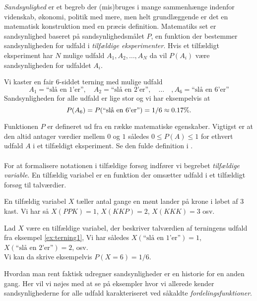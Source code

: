 \emph{Sandsynlighed} er et begreb der (mis)bruges i mange sammenhænge indenfor videnskab, økonomi, politik med mere, men helt grundlæggende er det en matematisk konstruktion med en præcis definition. Matematiks set er sandsynlighed baseret på sandsynlighedsmålet $P$, en funktion der bestemmer sandsynligheden for udfald i \emph{tilfældige eksperimenter}. Hvis et tilfældigt eksperiment har $N$ mulige udfald $A_1, A_2,\dots, A_N$ da vil $P(A_i)$ være sandsynligheden for udfaldet $A_i$.
\begin{example} \label{ex:terning1}
Vi kaster en fair 6-siddet terning med mulige udfald 
$$A_1 = \text{``slå en 1'er''}, \quad  A_2 = \text{``slå en 2'er''}, \quad \dots \quad, A_6 = \text{``slå en 6'er''}$$
Sandsynligheden for alle udfald er lige stor og vi har eksempelvis at \\
$$P(A_6) = P(``\text{slå en 6'er''}) = 1/6 \approx 0.17\%.$$
\end{example}
Funktionen $P$ er defineret ud fra en række matematiske egenskaber. Vigtigst er at den altid antager værdier mellem $0$ og $1$ således $0 \leq P(A) \leq 1$ for ethvert udfald $A$ i et tilfældigt eksperiment. Se den fulde definition i \cite[sektion 1.3]{olofsson2012}. 
\\ \\
For at formalisere notationen i tilfældige forsøg indfører vi begrebet \emph{tilfældige variable}. En tilfældig variabel er en funktion der omsætter udfald i et tilfældigt forsøg til talværdier.
\begin{example}
En tilfældig variabel $X$ tæller antal gange en mønt lander på krone i løbet af $3$ kast. Vi har så $X(PPK) = 1$, $X(KKP) = 2$, $X(KKK) = 3$ osv.
\end{example}
\begin{example} \label{ex:terning2} Lad $X$ være en tilfældige variabel, der beskriver talværdien af terningens udfald fra eksempel \ref{ex:terning1}, Vi har således $X(\text{``slå en 1'er''}) = 1$, $X(\text{``slå en 2'er''}) = 2$, osv. \\
Vi kan da skrive eksempelvis $P(X = 6) = 1/6$.
\end{example}
Hvordan man rent faktisk udregner sandsynligheder er en historie for en anden gang. Her vil vi nøjes med at se på eksempler hvor vi allerede kender sandsynlighederne for alle udfald karakteriseret ved såkaldte \textit{fordelingsfunktioner}. 